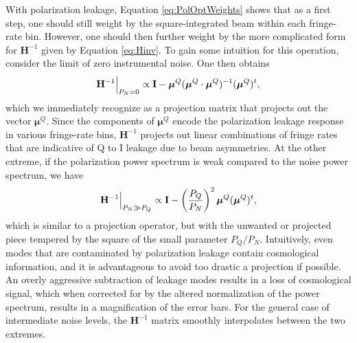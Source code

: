 \documentclass[twocolumn,apj,numberedappendix]{emulateapj}
\begin{document}
With polarization leakage, Equation \eqref{eq:PolOptWeights} shows that as a first step, one should still weight by
the square-integrated beam within each fringe-rate bin. However, one should then further weight by the more complicated
form for $\mathbf{H}^{-1}$ given by Equation \eqref{eq:Hinv}. To gain some intuition for
this operation, consider the limit of zero instrumental noise. One then obtains 
\begin{equation}
\mathbf{H}^{-1} \Big{|}_{P_N =0} \propto \mathbf{I} - \boldsymbol \mu^Q (\boldsymbol \mu^Q \cdot \boldsymbol
\mu^Q )^{-1} (\boldsymbol \mu^Q )^t,
\end{equation}
which we immediately recognize as a projection matrix that projects out the vector $\boldsymbol \mu^Q$. Since the
components of $\boldsymbol \mu^Q$ encode the polarization leakage response in various
fringe-rate bins, $\mathbf{H}^{-1}$ projects out linear combinations of
fringe rates that are indicative of Q to I leakage due to beam asymmetries. At the other
extreme, if the polarization power spectrum is weak compared to the noise power spectrum,
we have
\begin{equation}
\mathbf{H}^{-1} \Big{|}_{P_N \gg P_Q} \propto \mathbf{I} - \left(\frac{P_Q}{P_N} \right)^2 \boldsymbol \mu^Q  (\boldsymbol \mu^Q )^t,
\end{equation}
which is similar to a projection operator, but with the unwanted or projected piece tempered
by the square of the small parameter $P_Q / P_N$. Intuitively, even modes that are
contaminated by polarization leakage contain cosmological information, and it is advantageous
to avoid too drastic a projection if possible. An overly aggressive subtraction of leakage
modes results in a loss of cosmological signal, which when corrected for by the altered
normalization of the power spectrum, results in a magnification of the error bars. For the
general case of intermediate noise levels, the $\mathbf{H}^{-1}$ matrix smoothly interpolates
between the two extremes.
\end{document}
